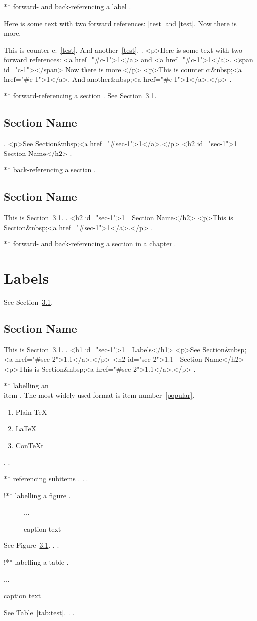 ** forward- and back-referencing a label
.

Here is some text with two forward references: \ref{test} and \ref{test}.
Now there is more.

This \label{test} is counter c:~\ref{test}. And another~\ref{test}.
.
<p>Here is some text with two forward references: <a href="#c-1">1</a> and <a href="#c-1">1</a>. <span id="c-1"></span> Now there is more.</p>
<p>This  is counter c:&nbsp;<a href="#c-1">1</a>. And another&nbsp;<a href="#c-1">1</a>.</p>
.


** forward-referencing a section
.
See Section~\ref{sec:test}.

\section{Section Name}
\label{sec:test}
.
<p>See Section&nbsp;<a href="#sec-1">1</a>.</p>
<h2 id="sec-1">1 Section Name</h2>
.


** back-referencing a section
.
\section{Section Name}

This \label{sec:test} is Section~\ref{sec:test}.
.
<h2 id="sec-1">1 Section Name</h2>
<p>This is Section&nbsp;<a href="#sec-1">1</a>.</p>
.


** forward- and back-referencing a section in a chapter
.
\chapter{Labels}

See Section~\ref{sec:test}.

\section{Section Name}
\label{sec:test}
This is Section~\ref{sec:test}.
.
<h1 id="sec-1">1 Labels</h1>
<p>See Section&nbsp;<a href="#sec-2">1.1</a>.</p>
<h2 id="sec-2">1.1 Section Name</h2>
<p>This is Section&nbsp;<a href="#sec-2">1.1</a>.</p>
.


** labelling an \\item
.
The most widely-used format is item number~\ref{popular}.
\begin{enumerate}
    \item Plain \TeX
    \item \label{popular} \LaTeX
    \item Con\TeX t
\end{enumerate}
.
.



** referencing subitems
.
.
.


!** labelling a figure
.
\begin{figure}
    ...
    \caption{caption text}
    \label{fig:test}
\end{figure}
See Figure~\ref{fig:test}.
.
.


!** labelling a table
.
\begin{table}
    ...
    \caption{caption text}
    \label{tab:test}
\end{table}
See Table~\ref{tab:test}.
.
.
